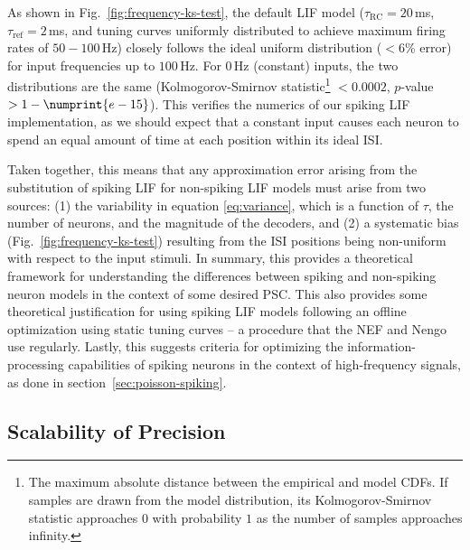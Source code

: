 As shown in Fig.~\ref{fig:frequency-ks-test}, the default LIF model ($\tau_\text{RC} = 20$\,ms, $\tau_\text{ref} = 2$\,ms, and tuning curves uniformly distributed to achieve maximum firing rates of $50-100$\,Hz) closely follows the ideal uniform distribution ($< 6$\% error) for input frequencies up to $100$\,Hz. For $0$\,Hz (constant) inputs, the two distributions are the same (Kolmogorov-Smirnov statistic\footnote{
The maximum absolute distance between the empirical and model CDFs.
If samples are drawn from the model distribution, its Kolmogorov-Smirnov statistic approaches $0$ with probability $1$ as the number of samples approaches infinity.}%
$<0.0002$, $p$-value~$> 1-\numprint{e-15}$).
This verifies the numerics of our spiking LIF implementation, as we should expect that a constant input causes each neuron to spend an equal amount of time at each position within its ideal ISI.

Taken together, this means that any approximation error arising from the substitution of spiking LIF for non-spiking LIF models must arise from two sources: (1) the variability in equation \ref{eq:variance}, which is a function of $\tau$, the number of neurons, and the magnitude of the decoders, and (2) a systematic bias (Fig.~\ref{fig:frequency-ks-test}) resulting from the ISI positions being non-uniform with respect to the input stimuli.
In summary, this provides a theoretical framework for understanding the differences between spiking and non-spiking neuron models in the context of some desired PSC.
This also provides some theoretical justification for using spiking LIF models following an offline optimization using static tuning curves -- a procedure that the NEF and Nengo use regularly.
Lastly, this suggests criteria for optimizing the information-processing capabilities of spiking neurons in the context of high-frequency signals, as done in section~\ref{sec:poisson-spiking}.

\subsection{Scalability of Precision}
\label{sec:scalability}


